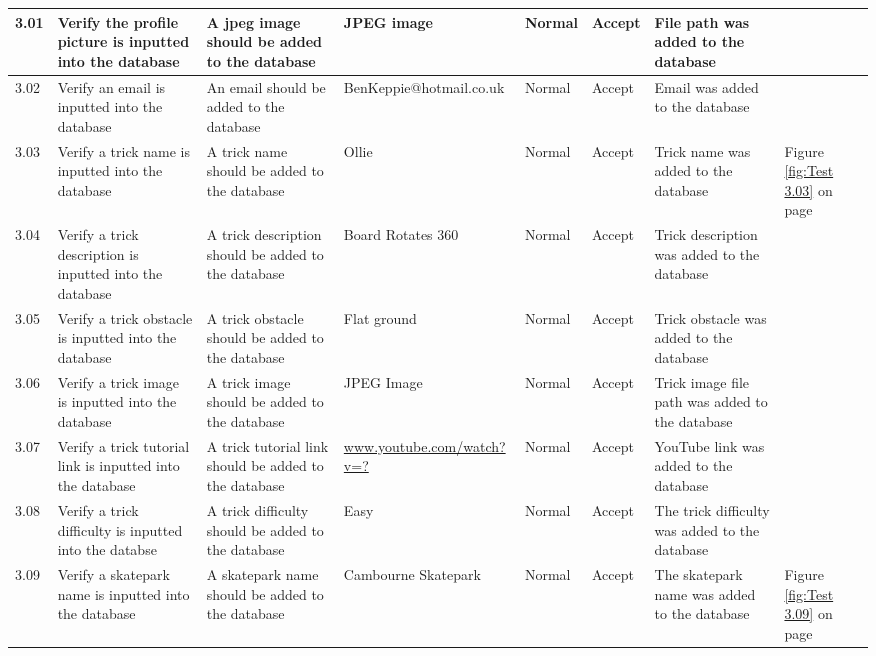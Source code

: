\begin{landscape}
\begin{center}
\begin{longtable}{|p{1.5cm}|p{2.5cm}|p{2.5cm}|p{2cm}|p{2cm}|p{2cm}|p{2cm}|p{2cm}|}
3.01 & Verify the profile picture is inputted into the database & A jpeg image should be added to the database & JPEG image & Normal & Accept & File path was added to the database & \\ \hline

3.02 & Verify an email is inputted into the database & An email should be added to the database & BenKeppie@hotmail.co.uk & Normal & Accept  & Email was added to the database & \\ \hline

3.03 & Verify a trick name is inputted into the database & A trick name should be added to the database & Ollie & Normal & Accept & Trick name was added to the database & Figure \ref{fig:Test 3.03} on page \pageref{fig:Test 3.03} \\ \hline

3.04 & Verify a trick description is inputted into the database & A trick description should be added to the database & Board Rotates 360 & Normal & Accept & Trick description was added to the database & \\ \hline

3.05  & Verify a trick obstacle is inputted into the database & A trick obstacle should be added to the database & Flat ground & Normal & Accept & Trick obstacle was added to the database & \\ \hline

3.06 & Verify a trick image is inputted into the database & A trick image should be added to the database & JPEG Image & Normal & Accept & Trick image file path was added to the database& \\ \hline

3.07 & Verify a trick tutorial link is inputted into the database & A trick tutorial link should be added to the database & \url{www.youtube.com/watch?v=?} & Normal & Accept & YouTube link was added to the database & \\ \hline

3.08 & Verify a trick difficulty is inputted into the databse & A trick difficulty should be added to the database & Easy & Normal & Accept & The trick difficulty was added to the database & \\ \hline

3.09 & Verify a skatepark name is inputted into the database & A skatepark name should be added to the database & Cambourne Skatepark & Normal & Accept & The skatepark name was added to the database & Figure \ref{fig:Test 3.09} on page \pageref{fig:Test 3.09} \\ \hline


\end{longtable}
\end{center}
\end{landscape}
